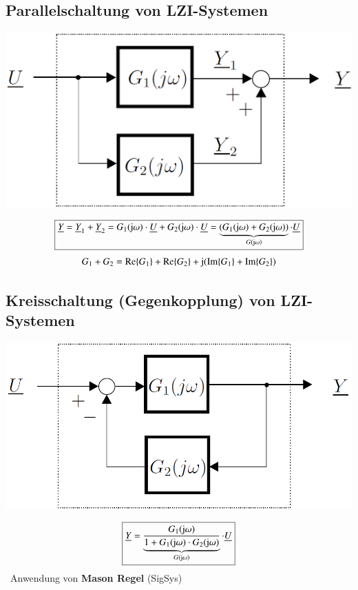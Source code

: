 \subsection{Parallelschaltung von LZI-Systemen}

\begin{center}
    \includegraphics[width=0.5\columnwidth]{images/frequenzgang_parallelschaltung.png}
\end{center}
$$ \boxed{ \underline{Y} = \underline{Y}_1 + \underline{Y}_2 = G_1(\mathrm{j} \omega) \cdot \underline{U} + G_2(\mathrm{j} \omega) \cdot \underline{U} 
    = \underbrace{(G_1(\mathrm{j} \omega) + G_2(\mathrm{j} \omega))}_{G(\mathrm{j} \omega)} \cdot \underline{U}} $$
$$ G_1 + G_2 = \mathrm{Re}\{ G_1 \} + \mathrm{Re}\{ G_2 \} + \mathrm{j} ( \mathrm{Im}\{ G_1 \} + \mathrm{Im}\{ G_2 \}) $$


\subsection{Kreisschaltung (Gegenkopplung) von LZI-Systemen}

\begin{minipage}[c]{0.5\columnwidth}
    \includegraphics[width=\columnwidth]{images/frequenzgang_kreisschaltung.png}
\end{minipage}
\hfill
\begin{minipage}[c]{0.48\columnwidth}
    $$ \boxed{ \underline{Y} = \underbrace{\frac{G_1(\mathrm{j} \omega)}{1 + G_1(\mathrm{j} \omega) \cdot G_2(\mathrm{j} \omega)}}_{G(\mathrm{j} \omega)} \cdot \underline{U}} $$
    \textrightarrow\ Anwendung von \textbf{Mason Regel} (SigSys)
\end{minipage}



